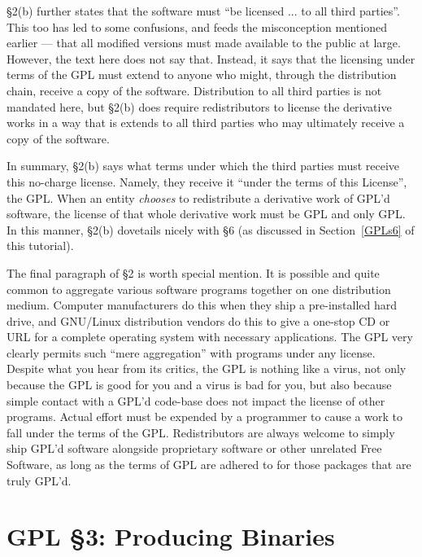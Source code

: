 \documentclass[12pt]{report}
\begin{document}
\S 2(b) further states that the software must ``be licensed ... to all
third parties''.  This too has led to some confusions, and feeds the
misconception mentioned earlier --- that all modified versions must made
available to the public at large.  However, the text here does not say
that.  Instead, it says that the licensing under terms of the GPL must
extend to anyone who might, through the distribution chain, receive a copy
of the software.  Distribution to all third parties is not mandated here,
but \S 2(b) does require redistributors to license the derivative works in
a way that is extends to all third parties who may ultimately receive a
copy of the software.

In summary, \S 2(b) says what terms under which the third parties must
receive this no-charge license.  Namely, they receive it ``under the terms
of this License'', the GPL.  When an entity \emph{chooses} to redistribute
a derivative work of GPL'd software, the license of that whole derivative
work must be GPL and only GPL\@.  In this manner, \S 2(b) dovetails nicely
with \S 6 (as discussed in Section~\ref{GPLs6} of this tutorial).

\medskip

The final paragraph of \S 2 is worth special mention.  It is possible and
quite common to aggregate various software programs together on one
distribution medium.  Computer manufacturers do this when they ship a
pre-installed hard drive, and GNU/Linux distribution vendors do this to
give a one-stop CD or URL for a complete operating system with necessary
applications.  The GPL very clearly permits such ``mere aggregation'' with
programs under any license.  Despite what you hear from its critics, the
GPL is nothing like a virus, not only because the GPL is good for you and
a virus is bad for you, but also because simple contact with a GPL'd
code-base does not impact the license of other programs.  Actual effort
must be expended by a programmer to cause a work to fall under the terms
of the GPL.  Redistributors are always welcome to simply ship GPL'd
software alongside proprietary software or other unrelated Free Software,
as long as the terms of GPL are adhered to for those packages that are
truly GPL'd.

\section{GPL \S 3: Producing Binaries}
\label{GPL-Section-3}
\end{document}
